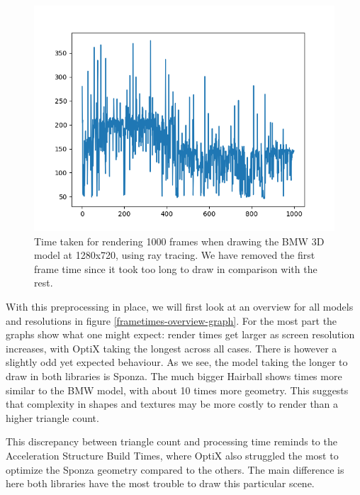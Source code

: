 \begin{figure}[hbt!]
    \centering
    \includegraphics[width=1.0\textwidth]{figuras/frametime-no-outlier.png}
    \caption{Time taken for rendering 1000 frames when drawing the BMW 3D model at 1280x720, using ray tracing. We have removed the first frame time since it took too long to draw in comparison with the rest.}
    \label{frametimes-no-outlier-graph}
\end{figure}

With this preprocessing in place, we will first look at an overview for all models and resolutions in figure \ref{frametimes-overview-graph}. For the most part the graphs show what one might expect: render times get larger as screen resolution increases, with OptiX taking the longest across all cases. There is however a slightly odd yet expected behaviour. As we see, the model taking the longer to draw in both libraries is Sponza. The much bigger Hairball shows times more similar to the BMW model, with about 10 times more geometry. This suggests that complexity in shapes and textures may be more costly to render than a higher triangle count. 

This discrepancy between triangle count and processing time reminds to the Acceleration Structure Build Times, where OptiX also struggled the most to optimize the Sponza geometry compared to the others. The main difference is here both libraries have the most trouble to draw this particular scene.

